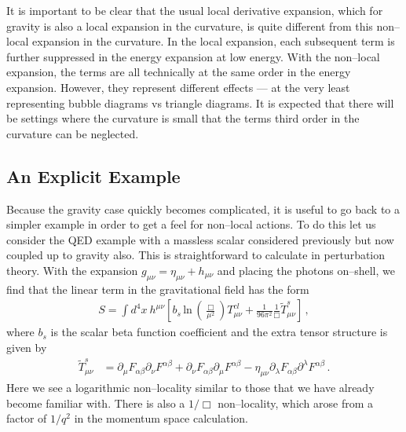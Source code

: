 \documentclass[12pt]{article}
\begin{document}
It is important to be clear that the usual local derivative expansion, which for gravity is also a local expansion in the curvature, is quite different from this non--local expansion in the curvature. In the local expansion, each subsequent term is further suppressed in the energy expansion at low energy. With the non--local expansion, the terms are all technically at the same order in the energy expansion. However, they represent different effects --- at the very least representing bubble diagrams vs triangle diagrams. It is expected that there will be settings where the curvature is small that the terms third order in the curvature can be neglected.


\subsection{An Explicit Example}

Because the gravity case quickly becomes complicated, it is useful to go back to a simpler example in order to get a feel for non--local actions. To do this let us consider the QED example with a massless scalar considered previously but now coupled up to gravity also. This is straightforward to calculate in perturbation theory. With the expansion $g_{\mu\nu} = \eta_{\mu\nu}+h_{\mu\nu}$ and placing the photons on--shell, we find that the linear term in the gravitational field has the form
\begin{align}
S= \int d^4x ~h^{\mu\nu}\left[b_s\,\text{ln}\,  \left(\frac{\Box}{\mu^2}\right) T^{cl}_{\mu\nu}+ \frac{1}{96 \pi^2}\frac{1}{\Box} \tilde{T}^{s}_{\mu\nu}\right]\,,
\label{withsource}
\end{align}
where $b_s$ is the scalar beta function coefficient and the extra tensor structure is given by
\begin{align}
\tilde{T}^{s}_{\mu\nu} &= \partial_{\mu}F_{\alpha\beta}\partial_{\nu}F^{\alpha\beta} + \partial_{\nu}F_{\alpha\beta}\partial_{\mu}F^{\alpha\beta} - \eta_{\mu\nu}\partial_{\lambda}F_{\alpha\beta}\partial^{\lambda}F^{\alpha\beta}\,.
\end{align}
Here we see a logarithmic non--locality similar to those that we have already become familiar with. There is also a $1/\Box$ non--locality, which arose from a factor of $1/q^2$ in the momentum space calculation.
\end{document}
